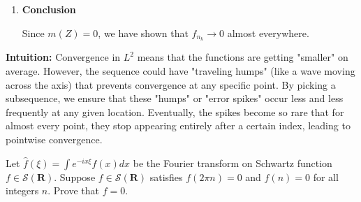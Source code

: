 \begin{solution}
\begin{enumerate}
    \item \textbf{Conclusion}

    Since $m(Z) = 0$, we have shown that $f_{n_k} \to 0$ almost everywhere.
\end{enumerate}

\par\vspace{\baselineskip}
\textbf{Intuition:} 
Convergence in $L^2$ means that the functions are getting "smaller" on average. However, the sequence could have "traveling humps" (like a wave moving across the axis) that prevents convergence at any specific point. By picking a subsequence, we ensure that these "humps" or "error spikes" occur less and less frequently at any given location. Eventually, the spikes become so rare that for almost every point, they stop appearing entirely after a certain index, leading to pointwise convergence.
\end{solution}

\begin{exercise}
\label{analysis:2018:8}
Let $\hat{f}(\xi) = \int e^{-ix\xi} f(x) dx$ be the Fourier transform on Schwartz function $f \in \mathcal{S}(\mathbf{R})$. Suppose $f \in \mathcal{S}(\mathbf{R})$ satisfies $f(2\pi n) = 0$ and $\hat{f}(n) = 0$ for all integers $n$. Prove that $f = 0$.
\end{exercise}

